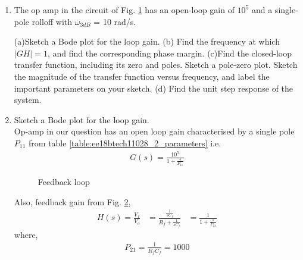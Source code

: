 \begin{enumerate}[label=\arabic*.,ref=\theenumi]
\item The op amp in the circuit of Fig. \ref{fig:ee18btech11028_2_q} has an open-loop gain of $10^{5}$ and a single-pole rolloff with $\omega_{3dB}$ = 10 rad/s.

\renewcommand{\thefigure}{\theenumi.\arabic{figure}}
%
\begin{figure}[!ht]
	\begin{center}
		\resizebox{\columnwidth}{!}{}
	\end{center}
\caption{}
\label{fig:ee18btech11028_2_q}
\end{figure}
%
\begin{table}[!ht]
    \centering
    
    \caption{}
    \label{table:ee18btech11028_2_parameters}
\end{table}
(a)Sketch a Bode plot for the loop gain.
(b) Find the frequency at which $ |GH|= 1$, and find the corresponding phase margin.
(c)Find the closed-loop transfer function, including its zero
and poles. Sketch a pole-zero plot. Sketch the magnitude of
the transfer function versus frequency, and label the important parameters on your sketch.
(d) Find the unit step response of the system.

\item Sketch a Bode plot for the loop gain.
\\
\solution
Op-amp in our question has an open loop gain characterised by a single pole $P_{11} $ from table \ref{table:ee18btech11028_2_parameters} i.e.
\begin{align}
    G(s) = \frac{10^5}{1 + \frac{s}{P_{11}}}
        \label{eq:ee18btech11028_2_2}
\end{align}
\begin{figure}[!ht]
	\begin{center}
		\resizebox{\columnwidth/2}{!}{}
		
	\end{center}
\caption{Feedback loop}
\label{fig:ee18btech11028_2_h}
\end{figure}
Also, feedback gain from Fig. \ref{fig:ee18btech11028_2_h},
\begin{align}
    H(s) = \frac{V_{f}}{V_{o}}
    &= \frac{\frac{1}{sC_{f}}}{R_{f} + \frac{1}{sC_{f}}}
    &= \frac{1}{1 + \frac{s}{P_{21}}}
        \label{eq:ee18btech11028_2_1}
\end{align}
where, 
\begin{align}
    P_{21} = \frac{1}{R_{f}C_{f}} = 1000
\end{align}


\end{enumerate}
